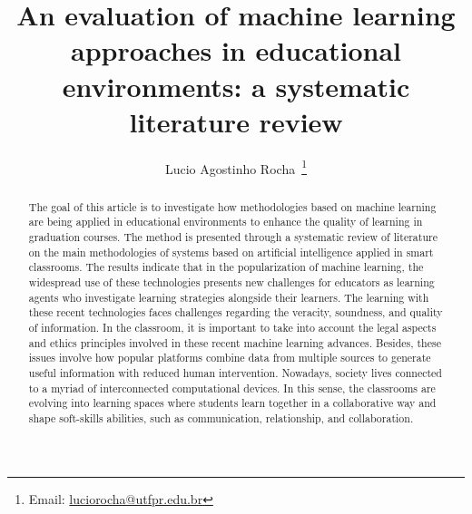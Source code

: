 \documentclass[english]{textolivre}
\title{An evaluation of machine learning approaches in educational environments: a systematic literature review}
\author[1]{Lucio Agostinho Rocha~\orcid{0000-0001-8804-8698}\thanks{Email: \href{mailto:luciorocha@utfpr.edu.br}{luciorocha@utfpr.edu.br}}}
\affil[1]{Universidade Tecnológica Federal do Paraná, Engenharia de Computação, Apucarana, PR, Brasil.}
\begin{document}
\maketitle
\begin{polyabstract}
\begin{abstract}
The goal of this article is to investigate how methodologies
based on machine learning are being applied in educational environments
to enhance the quality of learning in graduation courses. The method is
presented through a systematic review of literature on the main
methodologies of systems based on artificial intelligence applied in
smart classrooms. The results indicate that in the popularization of
machine learning, the widespread use of these technologies presents new
challenges for educators as learning agents who investigate learning
strategies alongside their learners. The learning with these recent
technologies faces challenges regarding the veracity, soundness, and
quality of information. In the classroom, it is important to take into
account the legal aspects and ethics principles involved in these recent
machine learning advances. Besides, these issues involve how popular
platforms combine data from multiple sources to generate useful
information with reduced human intervention. Nowadays, society lives
connected to a myriad of interconnected computational devices. In this
sense, the classrooms are evolving into learning spaces where students
learn together in a collaborative way and shape soft-skills abilities,
such as communication, relationship, and collaboration.

\end{abstract}


\end{polyabstract}
\end{document}
